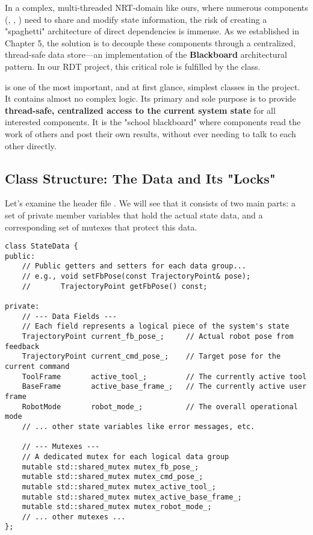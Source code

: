 In a complex, multi-threaded NRT-domain like ours, where numerous components (, , ) need to share and modify state information, the risk of creating a "spaghetti" architecture of direct dependencies is immense. As we established in Chapter 5, the solution is to decouple these components through a centralized, thread-safe data store—an implementation of the \textbf{Blackboard} architectural pattern. In our RDT project, this critical role is fulfilled by the \textbf{} class.

 is one of the most important, and at first glance, simplest classes in the project. It contains almost no complex logic. Its primary and sole purpose is to provide \textbf{thread-safe, centralized access to the current system state} for all interested components. It is the "school blackboard" where components read the work of others and post their own results, without ever needing to talk to each other directly.

\subsection{Class Structure: The Data and Its "Locks"}
\label{subsec:statedata_structure}

Let's examine the header file . We will see that it consists of two main parts: a set of private member variables that hold the actual state data, and a corresponding set of mutexes that protect this data.

\begin{verbatim}
class StateData {
public:
    // Public getters and setters for each data group...
    // e.g., void setFbPose(const TrajectoryPoint& pose);
    //       TrajectoryPoint getFbPose() const;

private:
    // --- Data Fields ---
    // Each field represents a logical piece of the system's state
    TrajectoryPoint current_fb_pose_;     // Actual robot pose from feedback
    TrajectoryPoint current_cmd_pose_;    // Target pose for the current command
    ToolFrame       active_tool_;         // The currently active tool
    BaseFrame       active_base_frame_;   // The currently active user frame
    RobotMode       robot_mode_;          // The overall operational mode
    // ... other state variables like error messages, etc.

    // --- Mutexes ---
    // A dedicated mutex for each logical data group
    mutable std::shared_mutex mutex_fb_pose_;
    mutable std::shared_mutex mutex_cmd_pose_;
    mutable std::shared_mutex mutex_active_tool_;
    mutable std::shared_mutex mutex_active_base_frame_;
    mutable std::shared_mutex mutex_robot_mode_;
    // ... other mutexes ...
};
\end{verbatim}
\label{lst:statedata-structure}

